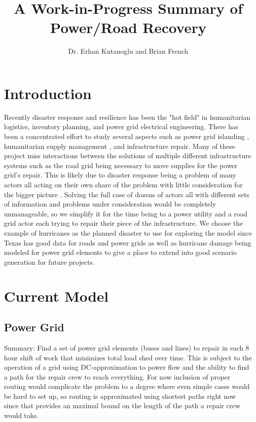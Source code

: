 \documentclass{article}
\begin{document}
\title{A Work-in-Progress Summary of Power/Road Recovery}
\author{Dr. Erhan Kutanoglu and Brian French}
\maketitle

	\section{Introduction}
	Recently disaster response and resilience has been the "hot field" in humanitarian logistics, inventory planning, and power grid electrical engineering. There has been a concentrated effort to study several aspects such as power grid islanding \cite{PanteliEA2016} \cite{DeepjyotiEA2018}, humanitarian supply management \cite{JiangEA2012} \cite{CaunhyeEA2012}, and infrastructure repair\cite{AksuEA2014}. Many of these project miss interactions between the solutions of multiple different infrastructure systems such as the road grid being necessary to move supplies for the power grid's repair. This is likely due to disaster response being a problem of many actors all acting on their own share of the problem with little consideration for the bigger picture\cite{VerasEA2012} . Solving the full case of dozens of actors all with different sets of information and problems under consideration would be completely unmanageable, so we simplify it for the time being to a power utility and a road grid actor each trying to repair their piece of the infrastructure. We choose the example of hurricanes as the planned disaster to use for exploring the model since Texas has good data for roads and power grids as well as hurricane damage being modeled for power grid elements \cite{GuikemaEA2010} to give a place to extend into good scenario generation for future projects.
	
	\section{Current Model}
	\subsection{Power Grid}
	Summary: Find a set of power grid elements (buses and lines) to repair in each 8 hour shift of work that minimizes total load shed over time. This is subject to the operation of a grid using DC-approximation to power flow and the ability to find a path for the repair crew to reach everything. For now inclusion of proper routing would complicate the problem to a degree where even simple cases would be hard to set up, so routing is approximated using shortest paths right now since that provides an maximal bound on the length of the path a repair crew would take. 
	
\end{document}
